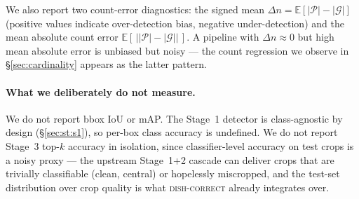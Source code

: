 We also report two count-error diagnostics: the signed mean
$\Delta n = \mathbb{E}[|\mathcal{P}| - |\mathcal{G}|]$ (positive values
indicate over-detection bias, negative under-detection) and the
mean absolute count error $\mathbb{E}[\,\big||\mathcal{P}| - |\mathcal{G}|\big|\,]$.
A pipeline with $\Delta n \approx 0$ but high mean absolute error is
unbiased but noisy --- the count regression we observe in
\S\ref{sec:cardinality} appears as the latter pattern.

\paragraph{What we deliberately do not measure.} We do not report
bbox IoU or mAP. The Stage~1 detector is class-agnostic by design (\S\ref{sec:st:s1}),
so per-box class accuracy is undefined. We do not report Stage~3 top-$k$
accuracy in isolation, since classifier-level accuracy on test crops is a
noisy proxy --- the upstream Stage~1+2 cascade can deliver crops that are
trivially classifiable (clean, central) or hopelessly miscropped, and the
test-set distribution over crop quality is what \textsc{dish-correct}
already integrates over.
